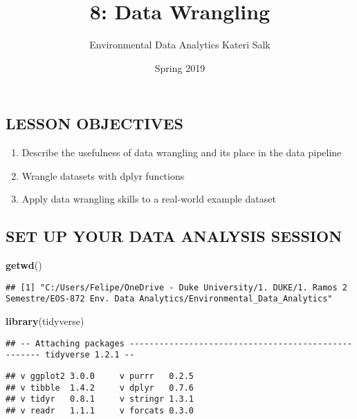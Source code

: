 \documentclass[]{article}
\title{8: Data Wrangling}
\author{Environmental Data Analytics \textbar{} Kateri Salk}
\date{Spring 2019}
\newenvironment{Shaded}{\begin{snugshade}}{\end{snugshade}}
\newcommand{\KeywordTok}[1]{\textcolor[rgb]{0.13,0.29,0.53}{\textbf{#1}}}
\newcommand{\NormalTok}[1]{#1}
\providecommand{\tightlist}{%
  \setlength{\itemsep}{0pt}\setlength{\parskip}{0pt}}
\begin{document}
\maketitle

\subsection{LESSON OBJECTIVES}\label{lesson-objectives}

\begin{enumerate}
\def\labelenumi{\arabic{enumi}.}
\tightlist
\item
  Describe the usefulness of data wrangling and its place in the data
  pipeline
\item
  Wrangle datasets with dplyr functions
\item
  Apply data wrangling skills to a real-world example dataset
\end{enumerate}

\subsection{SET UP YOUR DATA ANALYSIS
SESSION}\label{set-up-your-data-analysis-session}

\begin{Shaded}
\begin{Highlighting}[]
\KeywordTok{getwd}\NormalTok{()}
\end{Highlighting}
\end{Shaded}

\begin{verbatim}
## [1] "C:/Users/Felipe/OneDrive - Duke University/1. DUKE/1. Ramos 2 Semestre/EOS-872 Env. Data Analytics/Environmental_Data_Analytics"
\end{verbatim}

\begin{Shaded}
\begin{Highlighting}[]
\KeywordTok{library}\NormalTok{(tidyverse)}
\end{Highlighting}
\end{Shaded}

\begin{verbatim}
## -- Attaching packages ---------------------------------------------------- tidyverse 1.2.1 --
\end{verbatim}

\begin{verbatim}
## v ggplot2 3.0.0     v purrr   0.2.5
## v tibble  1.4.2     v dplyr   0.7.6
## v tidyr   0.8.1     v stringr 1.3.1
## v readr   1.1.1     v forcats 0.3.0
\end{verbatim}
\end{document}
